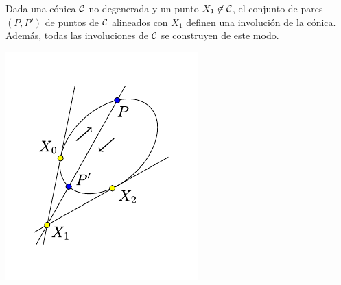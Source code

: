 \begin{prop}
	Dada una cónica $\mathcal{C}$ no degenerada y un punto $X_1\not\in\mathcal{C}$, el conjunto de pares $(P,P')$ de puntos de $\mathcal{C}$ alineados con $X_1$ definen una involución de la cónica. Además, todas las involuciones de $\mathcal{C}$ se construyen de este modo.
	\begin{center}
		\includegraphics[scale=1]{Graficos/Conicas/Involucion}
	\end{center}
\end{prop}
